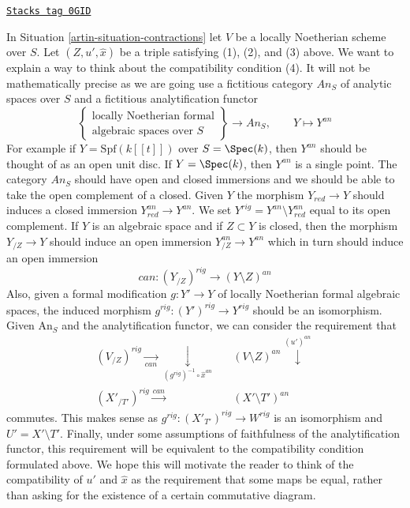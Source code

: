 \begin{remark}
\label{artin-remark-how-to-think-compatibility}
\href{https://stacks.math.columbia.edu/tag/0GID}{\texttt{Stacks tag 0GID}}

In Situation \ref{artin-situation-contractions} let $V$ be a locally Noetherian
scheme over $S$. Let $(Z, u', \hat x)$ be a triple satisfying (1), (2), and
(3) above. We want to explain a way to think about the compatibility
condition (4). It will not be mathematically precise as we are going use
a fictitious category $\textit{An}_S$ of analytic spaces over $S$
and a fictitious analytification functor
$$
\left\{
\begin{matrix}
\text{locally Noetherian formal} \\
\text{algebraic spaces over }S
\end{matrix}
\right\}
\longrightarrow
\textit{An}_S,
\quad\quad
Y \longmapsto Y^{an}
$$
For example if $Y = \text{Spf}(k[[t]])$ over $S = \Spec(k)$, then $Y^{an}$
should be thought of as an open unit disc. If $Y = \Spec(k)$, then $Y^{an}$
is a single point. The category $\textit{An}_S$ should have open and
closed immersions and we should be able to take the open complement
of a closed. Given $Y$ the morphism $Y_{red} \to Y$ should induces a
closed immersion $Y_{red}^{an} \to Y^{an}$. We set
$Y^{rig} = Y^{an} \setminus Y_{red}^{an}$ equal to its open complement.
If $Y$ is an algebraic space and if $Z \subset Y$ is closed, then
the morphism $Y_{/Z} \to Y$ should induce an open immersion
$Y_{/Z}^{an} \to Y^{an}$ which in turn should induce an open immersion
$$
can : (Y_{/Z})^{rig} \longrightarrow (Y \setminus Z)^{an}
$$
Also, given a formal modification $g : Y' \to Y$ of locally Noetherian formal
algebraic spaces, the induced morphism $g^{rig} : (Y')^{rig} \to Y^{rig}$
should be an isomorphism. Given $\text{An}_S$ and the analytification
functor, we can consider the requirement that
$$
\begin{array}{ccc}(V_{/Z})^{rig} \underset{can}{\longrightarrow}\underset{(g^{rig})^{-1} \circ \hat x^{an}}{\downarrow} &  & (V \setminus Z)^{an} \overset{(u')^{an}}{\downarrow} \\ (X'_{/T'})^{rig} \overset{can}{\longrightarrow} &  & (X' \setminus T')^{an}\end{array}
$$
commutes. This makes sense as $g^{rig} : (X'_{T'})^{rig} \to W^{rig}$
is an isomorphism and $U' = X' \setminus T'$. Finally, under some assumptions
of faithfulness of the analytification functor, this requirement will
be equivalent to the compatibility condition formulated above.
We hope this will motivate the reader to think of the compatibility
of $u'$ and $\hat x$ as the requirement that some maps be equal,
rather than asking for the existence of a certain commutative diagram.
\end{remark}

